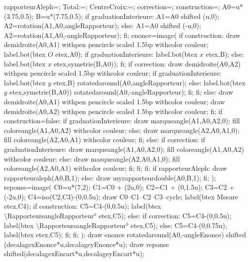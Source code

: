 {\begin{Geometrie}[CoinBG=\RapporteursCoinBG,CoinHD=\RapporteursCoinHD]
    rapporteurAleph=\RapporteursrapporteurAleph;
    Total:=\RapporteursgraduationTotale;%
    CentreCroix:=\RapporteurscentreCroix;%
    correction=\Rapporteurscorrection;
    construction=\Rapporteursconstruction;
    A0=u*(3.75,0.5);
    B=u*(7.75,0.5);
    if graduationInterieure:              
       A1=A0 shifted (u,0);
       A2=rotation(A1,A0,angleRapporteur);
    else:
       A1=A0 shifted (-u,0);
       A2=rotation(A1,A0,-angleRapporteur);
    fi;
    enonce=image(
      if construction:
         draw demidroite(A0,A1) withpen pencircle scaled 1.5bp withcolor couleur;
         label.bot(btex $O$ etex,A0);
         if graduationInterieure:
            label.bot(btex $x$ etex,B);
         else:
            label.bot(btex $x$ etex,symetrie(B,A0));
         fi;
         if correction:
            draw demidroite(A0,A2) withpen pencircle scaled 1.5bp withcolor couleur;
            if graduationInterieure:
               label.bot(btex $y$ etex,B) rotatedaround(A0,angleRapporteur);
	         else:
    		      label.bot(btex $y$ etex,symetrie(B,A0)) rotatedaround(A0,-angleRapporteur);
        		fi;
         fi;
      else:
         draw demidroite(A0,A1) withpen pencircle scaled 1.5bp withcolor couleur;
         draw demidroite(A0,A2) withpen pencircle scaled 1.5bp withcolor couleur;
      fi;
      if construction=false:
         if graduationInterieure:
            draw marqueangle(A1,A0,A2,0);
            fill coloreangle(A1,A0,A2) withcolor couleur;
         else:
            draw marqueangle(A2,A0,A1,0);
            fill coloreangle(A2,A0,A1) withcolor couleur;
         fi;
      else:
         if correction:
            if graduationInterieure:
               draw marqueangle(A1,A0,A2,0);
               fill coloreangle(A1,A0,A2) withcolor couleur;
            else:
               draw marqueangle(A2,A0,A1,0);
               fill coloreangle(A2,A0,A1) withcolor couleur;
            fi;
         fi;
      fi;
      if rapporteurAleph:
         draw rapporteuraleph(A0,B,1);
      else:
         draw myrapporteurdouble(A0,B,1);
      fi;
    );
    reponse=image(
      C0=u*(7,2);
      C1=C0 + (2u,0); 
      C2=C1 + (0,1.5u);
      C3=C2 + (-2u,0);
      C4=iso(C2,C3)-(0,0.5u);       
      draw C0--C1--C2--C3--cycle;
      label(btex Mesure etex,C4);
      if construction:
         C5=C4-(0,0.5u);
         label(btex \ang{\RapporteursangleRapporteur} etex,C5);      
      else:
         if correction:
            C5=C4-(0,0.5u);
            label(btex {\red \ang{\RapporteursangleRapporteur}} etex,C5);      
         else:
            C5=C4-(0,0.75u);
            label(btex \makebox[0.2\linewidth]{\dotfill} etex,C5);
         fi;
      fi;
    );
    draw enonce rotatedaround(A0,-angleEnonce) shifted (decalagexEnonce*u,decalageyEnonce*u);
    draw reponse shifted(decalagexEncart*u,decalageyEncart*u);     
 \end{Geometrie}
}

